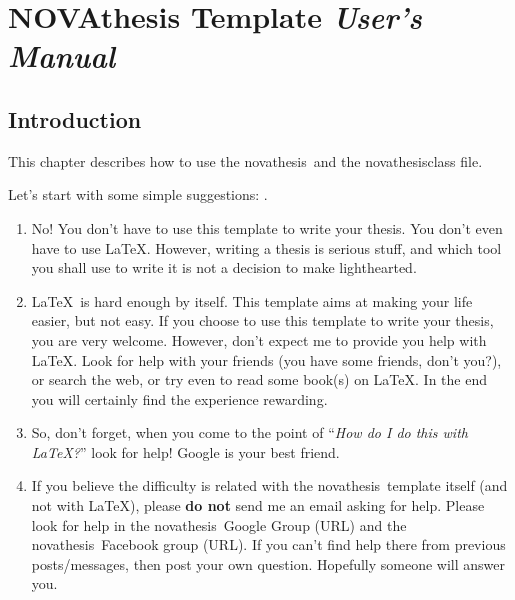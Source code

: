

\chapter{NOVAthesis Template \emph{User's Manual}}
\label{cha:users_manual}

\glsresetall

\begin{center}
\end{center}

\section{Introduction} %
\label{sec:introduction}

This chapter describes how to use the \gls{novathesis}\ and the \gls{novathesisclass} file.

Let's start with some simple suggestions: \cite{Moss85,DBLP:conf/atva/2004}.


\begin{enumerate}
  \item No! You don't have to use this template to write your thesis.  You don't even have to use \LaTeX.  However, writing a thesis is serious stuff, and which tool you shall use to write it is not a decision to make lighthearted.
  \item \LaTeX\ is hard enough by itself.  This template aims at making your life easier, but not easy. If you choose to use this template to write your thesis, you are very welcome.  However, don't expect me to provide you help with \LaTeX.  Look for help with your friends (you have some friends, don't you?), or search the web, or try even to read some book(s) on \LaTeX. In the end you will certainly find the experience rewarding.
  \item So, don't forget, when you come to the point of “\emph{How do I do this with \LaTeX?}” look for help!  Google is your best friend. 
  \item If you believe the difficulty is related with the \gls{novathesis}\ template itself (and not with \LaTeX), please \textbf{do not} send me an email asking for help.  Please look for help in the \gls{novathesis}\ Google Group (URL) and the \gls{novathesis}\ Facebook group (URL).  If you can't find help there from previous posts/messages, then post your own question. Hopefully someone will answer you.
\end{enumerate}

